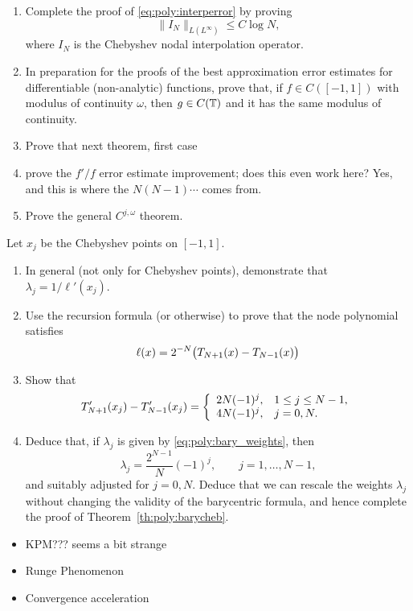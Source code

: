 \begin{exercise}
   \label{exr:poly:convergence}
   \begin{enumerate} \ilist
   \item Complete the proof of \eqref{eq:poly:interperror} by proving
      \[
         \| I_N \|_{L(L^\infty)} \leq C \log N,
      \]
      where $I_N$ is the Chebyshev nodal interpolation operator.

   \item In preparation for the proofs of the best approximation error estimates
      for differentiable (non-analytic) functions, prove that, if $f \in
      C([-1,1])$ with modulus of continuity $\omega$, then $g \in C(\mathbb{T})$ and it
      has the same modulus of continuity.

   \item Prove that \alert{next theorem, first case}

   \item prove the $f' / f$ error estimate improvement; does this even work here?
   Yes, and this is where the $N (N-1) \cdots$ comes from.

   \item Prove the general $C^{j,\omega}$ theorem.
   \end{enumerate}
\end{exercise}


\begin{exercise}
   \label{exr:poly:bary}
   Let $x_j$ be the Chebyshev points on $[-1,1]$.
   \begin{enumerate} \ilist
   \item In general (not only for Chebyshev points), demonstrate that $\lambda_j
      = 1 / \ell'(x_j)$.
   \item Use the recursion formula (or otherwise) to prove that the 
   node polynomial satisfies 
   \[
      \ell(x) = 2^{-N} \big(T_{N+1}(x) - T_{N-1}(x)\big)
   \]
   \item Show that 
   \[
      T_{N+1}'(x_j) - T_{N-1}'(x_j) = 
      \left\{ \begin{array}{ll}  
         2N(-1)^j, & 1 \leq j \leq N-1, \\
         4N(-1)^j, & j = 0, N.
       \end{array} \right.
   \]
   \item Deduce that, if $\lambda_j$ is given by \eqref{eq:poly:bary_weights}, then 
   \[
      \lambda_j = \frac{2^{N-1}}{N} (-1)^j, \qquad j = 1, \dots, N-1,
   \]
   and suitably adjusted for $j = 0, N$. Deduce that we can rescale the weights
   $\lambda_j$ without changing the validity of the barycentric formula, and
   hence complete the proof of Theorem~\ref{th:poly:barycheb}.
   \qedhere
   \end{enumerate}
\end{exercise}

\begin{itemize}
\item KPM??? seems a bit strange
\item Runge Phenomenon
\item Convergence acceleration
\end{itemize}
